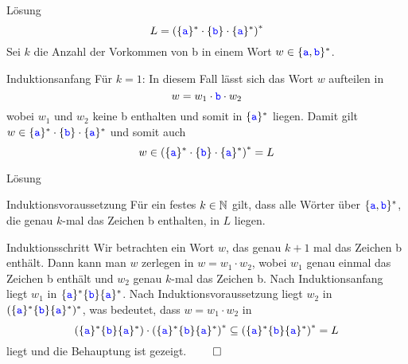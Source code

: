 \begin{frame}{Lösung}
	$$L = \left(\{\word a\}^\ast \cdot \{\word b\} \cdot \{\word a\}^\ast \right)^\ast$$
	Sei $k$ die Anzahl der Vorkommen von \word b in einem Wort $w \in \{\word a, \word b\}^\ast$.
	\begin{block}{Induktionsanfang}  \pause
		Für $k = 1$: In diesem Fall lässt sich das Wort $w$ aufteilen in $$w = w_1 \cdot \word b \cdot w_2$$ wobei $w_1$ und $w_2$ keine \word b enthalten und somit in $\{\word a\}^\ast$ liegen. Damit gilt $w \in \{\word a\}^\ast \cdot \{\word b\} \cdot \{\word a\}^\ast$ und somit auch $$w \in \left(\{\word a\}^\ast \cdot \{\word b\} \cdot \{\word a\}^\ast \right)^\ast = L$$
	\end{block}
\end{frame}

\begin{frame}{Lösung}
	\begin{block}{Induktionsvoraussetzung}  \pause
		Für ein festes $k \in \N$ gilt, dass alle Wörter über $\{\word a, \word b\}^\ast$, die genau $k$-mal das Zeichen \word b enthalten, in $L$ liegen.
	\end{block} \pause
	\begin{block}{Induktionsschritt}  \pause
		Wir betrachten ein Wort $w$, das genau $k + 1$ mal das Zeichen \word b enthält. Dann kann man $w$ zerlegen in $w = w_1 \cdot w_2$, wobei $w_1$ genau einmal das Zeichen \word b enthält und $w_2$ genau $k$-mal das Zeichen \word b. \pause Nach Induktionsanfang liegt $w_1$ in $\{\word a\}^\ast \{\word b\}\{\word a\}^\ast$. Nach Induktionsvoraussetzung liegt $w_2$ in $(\{\word a\}^\ast \{\word b\}\{\word a\}^\ast )^\ast$, was bedeutet, dass $w = w_1 \cdot w_2$ in $$\left(\{\word a\}^\ast \{\word b\}\{\word a\}^\ast \right) \* \left(\{\word a\}^\ast \{\word b\}\{\word a\}^\ast \right)^\ast \subseteq \left(\{\word a\}^\ast \{\word b\}\{\word a\}^\ast \right)^\ast = L$$ liegt und die Behauptung ist gezeigt. $\qed$
	\end{block}
\end{frame}

